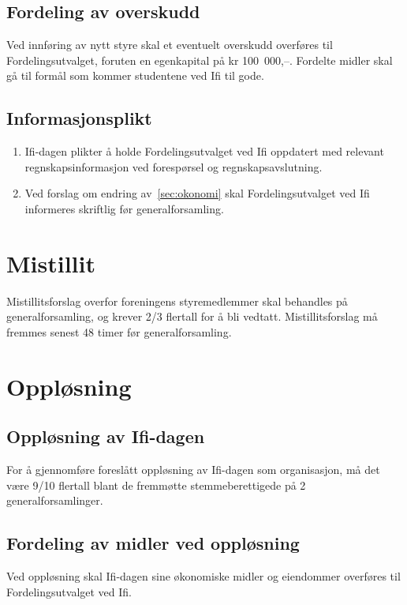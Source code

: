 \documentclass[norsk,a4paper]{article}
\begin{document}
\subsection{Fordeling av overskudd}
Ved innføring av nytt styre skal et eventuelt overskudd overføres til Fordelingsutvalget, foruten en egenkapital på kr 100~000,--. Fordelte midler skal gå til formål som kommer studentene ved Ifi til gode.
\subsection{Informasjonsplikt}
        \begin{enumerate}
            \item{Ifi-dagen plikter å holde Fordelingsutvalget ved Ifi oppdatert med relevant regnskapsinformasjon ved forespørsel og regnskapsavslutning.}
            \item{Ved forslag om endring av~\ref{sec:okonomi} skal Fordelingsutvalget ved Ifi informeres skriftlig før generalforsamling.}
        \end{enumerate}

\section{Mistillit}
Mistillitsforslag overfor foreningens styremedlemmer skal behandles på generalforsamling, og krever 2/3 flertall for å bli vedtatt. Mistillitsforslag må fremmes senest 48 timer før generalforsamling.

\section{Oppløsning}
\subsection{Oppløsning av Ifi-dagen}
        For å gjennomføre foreslått oppløsning av Ifi-dagen som organisasjon, må det være 9/10 flertall
        blant de fremmøtte stemmeberettigede på 2 generalforsamlinger.
\subsection{Fordeling av midler ved oppløsning}
        Ved oppløsning skal Ifi-dagen sine økonomiske midler og eiendommer overføres til
		Fordelingsutvalget ved Ifi.\label{ref:lastpage}
\end{document}
